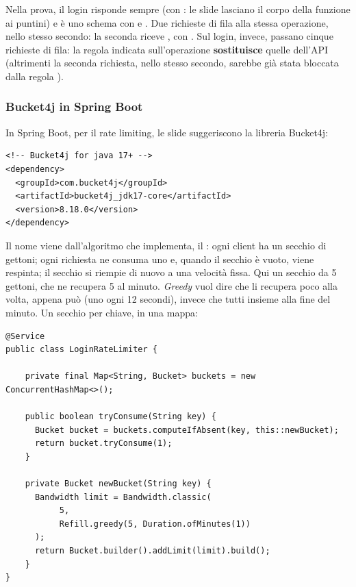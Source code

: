 Nella prova, il login risponde sempre  (con
: le slide lasciano il corpo della funzione ai puntini) e
 è uno schema con  e . Due
richieste di fila alla stessa operazione, nello stesso secondo: la seconda
riceve , con . Sul login, invece, passano cinque
richieste di fila: la regola indicata sull'operazione \textbf{sostituisce} quelle
dell'API (altrimenti la seconda richiesta, nello stesso secondo, sarebbe già
stata bloccata dalla regola ).

\subsubsection{Bucket4j in Spring Boot}

In Spring Boot, per il rate limiting, le slide suggeriscono la libreria
Bucket4j:

\begin{lstlisting}[style=xml, name=pom.xml]
<!-- Bucket4j for java 17+ -->
<dependency>
  <groupId>com.bucket4j</groupId>
  <artifactId>bucket4j_jdk17-core</artifactId>
  <version>8.18.0</version>
</dependency>
\end{lstlisting}

Il nome viene dall'algoritmo che implementa, il : ogni client
ha un secchio di gettoni; ogni richiesta ne consuma uno e, quando il secchio è
vuoto, viene respinta; il secchio si riempie di nuovo a una velocità fissa. Qui
un secchio da 5 gettoni, che ne recupera 5 al minuto. \textit{Greedy} vuol dire
che li recupera poco alla volta, appena può (uno ogni 12 secondi), invece che
tutti insieme alla fine del minuto. Un secchio per chiave, in una mappa:

\begin{lstlisting}[style=java, name=LoginRateLimiter.java]
@Service
public class LoginRateLimiter {

    private final Map<String, Bucket> buckets = new ConcurrentHashMap<>();

    public boolean tryConsume(String key) {
      Bucket bucket = buckets.computeIfAbsent(key, this::newBucket);
      return bucket.tryConsume(1);
    }

    private Bucket newBucket(String key) {
      Bandwidth limit = Bandwidth.classic(
           5,
           Refill.greedy(5, Duration.ofMinutes(1))
      );
      return Bucket.builder().addLimit(limit).build();
    }
}
\end{lstlisting}

